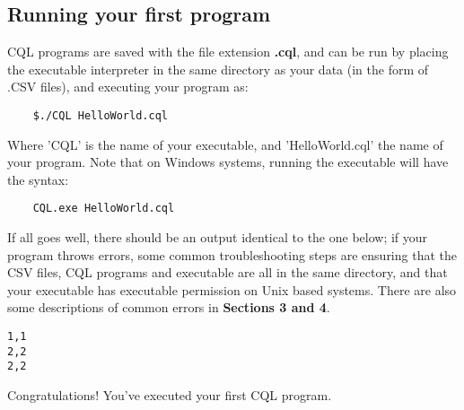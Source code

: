 \subsection{Running your first program}
\begin{normalsize}
CQL programs are saved with the file extension \textbf{.cql}, and can be run by placing the executable interpreter in the same directory as your data (in the form of .CSV files), and executing your program as:
\begin{lstlisting}
	$./CQL HelloWorld.cql
\end{lstlisting}
Where 'CQL' is the name of your executable, and 'HelloWorld.cql' the name of your program. Note that on Windows systems, running the executable will have the syntax:
\begin{lstlisting}
	CQL.exe HelloWorld.cql
\end{lstlisting}
If all goes well, there should be an output identical to the one below; if your program throws errors, some common troubleshooting steps are ensuring that the CSV files, CQL programs and executable are all in the same directory, and that your executable has executable permission on Unix based systems. There are also some descriptions of common errors in \textbf{Sections 3 and 4}.
\end{normalsize}
\begin{lstlisting}[style=framed]
1,1
2,2
2,2
\end{lstlisting}
\begin{normalsize}
Congratulations! You've executed your first CQL program. 
\end{normalsize}
